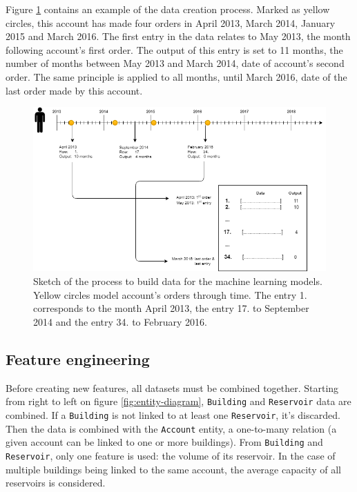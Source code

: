 Figure \ref{fig:data-build-example} contains an example of the data creation process. Marked as yellow circles, this account has made four orders in April 2013, March 2014, January 2015 and March 2016. The first entry in the data relates to May 2013, the month following account's first order. The output of this entry is set to 11 months, the number of months between May 2013 and March 2014, date of account's second order. The same principle is applied to all months, until March 2016, date of the last order made by this account.

\begin{figure}[h]
    \hspace{-1cm}
    \includegraphics[width=17cm]{images/data-build-ml-example.png}
    \caption[Process to build data for machine learning]{Sketch of the process to build data for the machine learning models. Yellow circles model account's orders through time. The entry 1. corresponds to the month April 2013, the entry 17. to September 2014 and the entry 34. to February 2016.}
    \label{fig:data-build-example}
\end{figure}


\subsection{Feature engineering}\label{sec:ml-features}

Before creating new features, all datasets must be combined together. Starting from right to left on figure \ref{fig:entity-diagram}, \texttt{Building} and \texttt{Reservoir} data are combined. If a \texttt{Building} is not linked to at least one \texttt{Reservoir}, it's discarded. Then the data is combined with the \texttt{Account} entity, a one-to-many relation (a given account can be linked to one or more buildings). From \texttt{Building} and \texttt{Reservoir}, only one feature is used: the volume of its reservoir. In the case of multiple buildings being linked to the same account, the average capacity of all reservoirs is considered.

